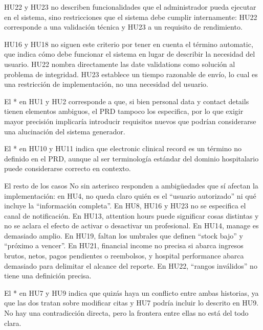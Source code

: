 HU22 y HU23 no describen funcionalidades que el administrador pueda ejecutar en el sistema, sino restricciones que el sistema debe cumplir internamente: HU22 corresponde a una validación técnica y HU23 a un requisito de rendimiento.

HU16 y HU18 no siguen este criterio por tener en cuenta el término automatic, que indica cómo debe funcionar el sistema en lugar de describir la necesidad del usuario. 
HU22 nombra directamente las date validations como solución al problema de integridad. HU23 establece un tiempo razonable de envío, lo cual es una restricción de implementación, no una necesidad del usuario.

El * en HU1 y HU2 corresponde a que, si bien personal data y contact details tienen elementos ambiguos, el PRD tampoco los especifica, por lo que exigir mayor precisión implicaría introducir requisitos nuevos que podrían considerarse una alucinación del sistema generador.

El * en HU10 y HU11 indica que electronic clinical record es un término no definido en el PRD, aunque al ser terminología estándar del dominio hospitalario puede considerarse correcto en contexto.

El resto de los casos No sin asterisco responden a ambigüedades que sí afectan la implementación: en HU4, no queda claro quién es el ``usuario autorizado'' ni qué incluye la ``información completa''. En HU8, HU16 y HU23 no se especifica el canal de notificación.
En HU13, attention hours puede significar cosas distintas y no se aclara el efecto de activar o desactivar un profesional. 
En HU14, manage es demasiado amplio. 
En HU19, faltan los umbrales que definen ``stock bajo'' y ``próximo a vencer''. 
En HU21, financial income no precisa si abarca ingresos brutos, netos, pagos pendientes o reembolsos, y hospital performance abarca demasiado para delimitar el alcance del reporte. 
En HU22, ``rangos inválidos'' no tiene una definición precisa.

El * en HU7 y HU9 indica que quizás haya un conflicto entre ambas historias, ya que las dos tratan sobre modificar citas y HU7 podría incluir lo descrito en HU9. No hay una contradicción directa, pero la frontera entre ellas no está del todo clara.

